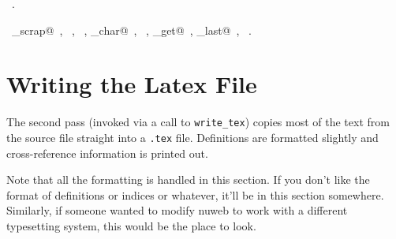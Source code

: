 \documentclass[a4paper]{report}
\begin{document}
\begin{flushleft}
\begin{minipage}{\linewidth}
\begin{list}{}{\setlength{\itemsep}{-\parsep}\setlength{\itemindent}{-\leftmargin}}
\item \NWtxtMacroRefIn\ .
\item \NWtxtIdentsUsed\nobreak\  \verb@copy_scrap@\nobreak\ , \verb@fprintf@\nobreak\ , \verb@fputs@\nobreak\ , \verb@nw_char@\nobreak\ , \verb@scraps@\nobreak\ , \verb@source_get@\nobreak\ , \verb@source_last@\nobreak\ , \verb@TRUE@\nobreak\ .
\item{}
\end{list}
\end{minipage}\vspace{4ex}
\end{flushleft}
\section{Writing the Latex File} \label{latex-file}

The second pass (invoked via a call to \verb|write_tex|) copies most of
the text from the source file straight into a \verb|.tex| file.
Definitions are formatted slightly and cross-reference information is
printed out.

Note that all the formatting is handled in this section.
If you don't like the format of definitions or indices or whatever,
it'll be in this section somewhere. Similarly, if someone wanted to
modify nuweb to work with a different typesetting system, this would
be the place to look.
\end{document}
